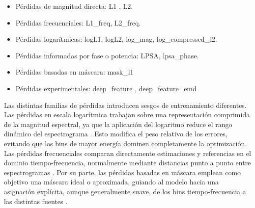 \begin{itemize}
    \begin{itemize}
        \item Pérdidas de magnitud directa: L1 , L2.
        \item Pérdidas frecuenciales: L1\_freq, L2\_freq.
        \item Pérdidas logarítmicas: logL1, logL2, log\_mag, log\_compressed\_l2.
        \item Pérdidas informadas por fase o potencia: LPSA, lpsa\_phase.
        \item Pérdidas basadas en máscara: mask\_l1
        \item Pérdidas experimentales: deep\_feature , deep\_feature\_emd
    \end{itemize}

Las distintas familias de pérdidas introducen sesgos de entrenamiento diferentes.
Las pérdidas en escala logarítmica trabajan sobre una representación comprimida de la magnitud espectral, ya que la aplicación del logaritmo reduce el rango dinámico del espectrograma \cite{yang2021dprtf}. Esto modifica el peso relativo de los errores, evitando que los bins de mayor energía dominen completamente la optimización.
Las pérdidas frecuenciales comparan directamente estimaciones y referencias en el dominio tiempo-frecuencia, normalmente mediante distancias punto a punto entre espectrogramas \cite{sahai2019spectrogram}. 
Por su parte, las pérdidas basadas en máscara emplean como objetivo una máscara ideal o aproximada, guiando al modelo hacia una asignación explícita, aunque generalmente suave, de los bins tiempo-frecuencia a las distintas fuentes \cite{xia2017optimalratio,wang2008tfmasking}.

\end{itemize}